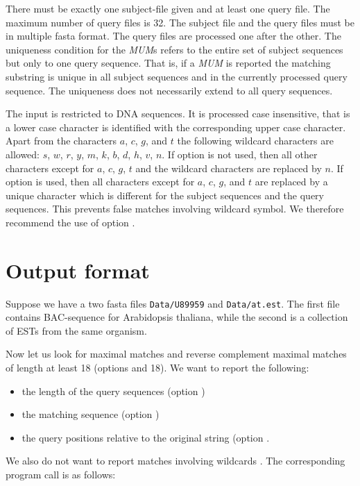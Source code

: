 \documentclass[12pt]{article}
\newcommand{\MUM}[0]{\textit{MUM}\xspace}
\begin{document}
There must be exactly one subject-file given and at least one
query file. The maximum number of query files is 32.
The subject file and the query files must be in multiple fasta format.
The query files are processed one after the other. The uniqueness condition
for the \MUM{s} refers to the entire set of subject sequences but
only to one query sequence. That is, if a \MUM is reported the
matching substring is unique in all subject sequences and in the currently
processed query sequence. The uniqueness does not necessarily extend to
all query sequences.

The input is restricted to DNA sequences. It is processed case 
insensitive, that is a lower case character is identified with the 
corresponding upper case character.
Apart from the characters $a$, $c$, $g$, and $t$ the following wildcard
characters are allowed: $s$, $w$, $r$, $y$, $m$, $k$, $b$, $d$, $h$, 
$v$, $n$.  If option  is not used, then all
other characters except for $a$, $c$, $g$, $t$ and the wildcard characters
are replaced by $n$. If option  is used,
then all characters except for $a$, $c$, $g$, and $t$ are replaced by
a unique character which is different for the subject sequences and
the query sequences. This prevents false matches involving wildcard symbol.
We therefore recommend the use of option .

\section{Output format}
Suppose we have a two fasta files \texttt{Data/U89959} and
\texttt{Data/at.est}. The first file contains BAC-sequence for
Arabidopsis thaliana, while the second is a collection of 
ESTs from the same organism.

Now let us look for maximal matches and reverse complement maximal
matches of length at least 18 (options  and  18). 
We want to 
report the following:
\begin{itemize}
\item
the length of the query sequences (option )
\item
the matching sequence (option )
\item
the query positions relative to the original string (option . 
\end{itemize}
We also do not want to report matches involving wildcards . The 
corresponding program call is as follows:
\end{document}
